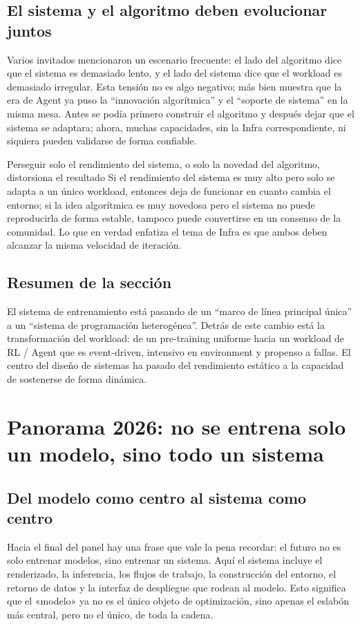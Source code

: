 \documentclass[a4paper]{article}
\begin{document}
\subsection{El sistema y el algoritmo deben evolucionar juntos}
Varios invitados mencionaron un escenario frecuente: el lado del algoritmo dice que el sistema es demasiado lento, y el lado del sistema dice que el workload es demasiado irregular. Esta tensión no es algo negativo; más bien muestra que la era de Agent ya puso la ``innovación algorítmica'' y el ``soporte de sistema'' en la misma mesa. Antes se podía primero construir el algoritmo y después dejar que el sistema se adaptara; ahora, muchas capacidades, sin la Infra correspondiente, ni siquiera pueden validarse de forma confiable.

\begin{warningbox}{Perseguir solo el rendimiento del sistema, o solo la novedad del algoritmo, distorsiona el resultado}
Si el rendimiento del sistema es muy alto pero solo se adapta a un único workload, entonces deja de funcionar en cuanto cambia el entorno; si la idea algorítmica es muy novedosa pero el sistema no puede reproducirla de forma estable, tampoco puede convertirse en un consenso de la comunidad. Lo que en verdad enfatiza el tema de Infra es que ambos deben alcanzar la misma velocidad de iteración.
\end{warningbox}

\subsection{Resumen de la sección}
El sistema de entrenamiento está pasando de un ``marco de línea principal única'' a un ``sistema de programación heterogénea''. Detrás de este cambio está la transformación del workload: de un pre-training uniforme hacia un workload de RL / Agent que es event-driven, intensivo en environment y propenso a fallas. El centro del diseño de sistemas ha pasado del rendimiento estático a la capacidad de sostenerse de forma dinámica.
\section{Panorama 2026: no se entrena solo un modelo, sino todo un sistema}

\subsection{Del modelo como centro al sistema como centro}
Hacia el final del panel hay una frase que vale la pena recordar: el futuro no es solo entrenar modelos, sino entrenar un sistema. Aquí el sistema incluye el renderizado, la inferencia, los flujos de trabajo, la construcción del entorno, el retorno de datos y la interfaz de despliegue que rodean al modelo. Esto significa que el «modelo» ya no es el único objeto de optimización, sino apenas el eslabón más central, pero no el único, de toda la cadena.
\end{document}
